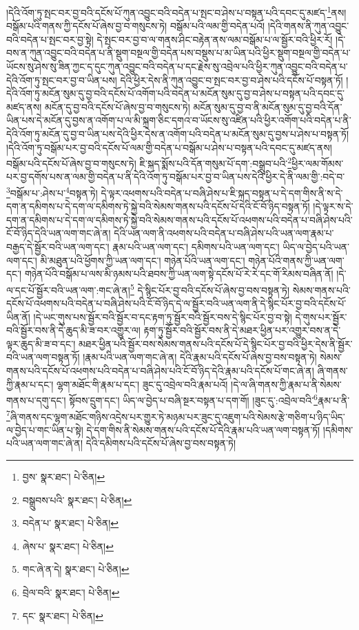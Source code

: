 །དེའི་འོག་ཏུ་སྤང་བར་བྱ་བའི་དངོས་པོ་ཀུན་འབྱུང་བའི་བདེན་པ་སྤང་བ་ཤེས་པ་བསྟན་པའི་དབང་དུ་མཛད་\footnote{བྱས་  སྣར་ཐང་།  པེ་ཅིན། }ནས། བསྒོམ་པའི་གནས་ཀྱི་དངོས་པོ་ཞེས་བྱ་བ་གསུངས་ཏེ། བསྒོམ་པའི་ལམ་གྱི་བདེན་པའོ། །དེའི་གནས་ནི་ཀུན་འབྱུང་བའི་བདེན་པ་སྤང་བར་བྱ་སྟེ། དེ་སྤང་བར་བྱ་བ་ལ་གནས་ཤིང་བརྟེན་ནས་ལམ་བསྒོམ་པ་ལ་སྦྱོར་བའི་ཕྱིར་རོ། །དེ་བས་ན་ཀུན་འབྱུང་བའི་བདེན་པ་ནི་སྡུག་བསྔལ་གྱི་བདེན་པས་བསྡུས་པ་མ་ཡིན་པའི་ཕྱིར་སྡུག་བསྔལ་གྱི་བདེན་པ་ཡོངས་སུ་ཤེས་སུ་ཟིན་ཀྱང་ད་དུང་ཀུན་འབྱུང་བའི་བདེན་པ་དང་རྗེས་སུ་འབྲེལ་པའི་ཕྱིར་ཀུན་འབྱུང་བའི་བདེན་པ་དེའི་འོག་ཏུ་སྤང་བར་བྱ་བ་ཡིན་པས། དེའི་ཕྱིར་དེས་ནི་ཀུན་འབྱུང་བ་སྤང་བར་བྱ་བ་ཤེས་པའི་དངོས་པོ་བསྟན་ཏོ། །དེའི་འོག་ཏུ་མངོན་སུམ་དུ་བྱ་བའི་དངོས་པོ་འགོག་པའི་བདེན་པ་མངོན་སུམ་དུ་བྱ་བ་ཤེས་པ་བསྟན་པའི་དབང་དུ་མཛད་ནས། མངོན་དུ་བྱ་བའི་དངོས་པོ་ཞེས་བྱ་བ་གསུངས་ཏེ། མངོན་སུམ་དུ་བྱ་བ་ནི་མངོན་སུམ་དུ་བྱ་བའི་དོན་ཡིན་པས་དེ་མངོན་དུ་བྱས་ན་འགོག་པ་ལ་མི་སྐྲག་ཅིང་དགའ་བ་ཡོངས་སུ་འཛིན་པའི་ཕྱིར་འགོག་པའི་བདེན་པ་ནི་དེའི་འོག་ཏུ་མངོན་དུ་བྱ་བ་ཡིན་པས་དེའི་ཕྱིར་དེས་ན་འགོག་པའི་བདེན་པ་མངོན་སུམ་དུ་བྱས་པ་ཤེས་པ་བསྟན་ཏོ། །དེའི་འོག་ཏུ་བསྒོམ་པར་བྱ་བའི་དངོས་པོ་ལམ་གྱི་བདེན་པ་བསྒོམ་པ་ཤེས་པ་བསྟན་པའི་དབང་དུ་མཛད་ནས། བསྒོམ་པའི་དངོས་པོ་ཞེས་བྱ་བ་གསུངས་ཏེ། ཇི་སྐད་སྨོས་པའི་དོན་གསུམ་པོ་དག་:བསྒྲུབ་པའི་\footnote{བསྒྲུབས་པའི་  སྣར་ཐང་།  པེ་ཅིན། }ཕྱིར་ལམ་གོམས་པར་བྱ་དགོས་པས་ན་ལམ་གྱི་བདེན་པ་ནི་དེའི་འོག་ཏུ་བསྒོམ་པར་བྱ་བ་ཡིན་པས་དེའི་ཕྱིར་དེ་ནི་ལམ་གྱི་:བདེ་བ་\footnote{བདེན་པ་  སྣར་ཐང་།  པེ་ཅིན། }བསྒོམ་པ་:ཤེས་པ་\footnote{ཞེས་པ་  སྣར་ཐང་།  པེ་ཅིན། }བསྟན་ཏེ། དེ་ལྟར་འཕགས་པའི་བདེན་པ་བཞི་ཤེས་པ་ཇི་སྐད་བསྟན་པ་དེ་དག་གིས་ནི་ས་དེ་དག་ན་དམིགས་པ་དེ་དག་ལ་དམིགས་ཏེ་སྐྱེ་བའི་སེམས་གནས་པའི་དངོས་པོ་དེའི་ངོ་བོ་ཉིད་བསྟན་ཏོ། །དེ་ལྟར་ས་དེ་དག་ན་དམིགས་པ་དེ་དག་ལ་དམིགས་ཏེ་སྐྱེ་བའི་སེམས་གནས་པའི་དངོས་པོ་འཕགས་པའི་བདེན་པ་བཞི་ཤེས་པའི་ངོ་བོ་ཉིད་དེའི་ཡན་ལག་གང་ཞེ་ན། དེའི་ཡན་ལག་ནི་འཕགས་པའི་བདེན་པ་བཞི་ཤེས་པའི་ཡན་ལག་རྣམ་པ་བརྒྱད་དེ་སྦྱོར་བའི་ཡན་ལག་དང་། རྣམ་པའི་ཡན་ལག་དང་། དམིགས་པའི་ཡན་ལག་དང་། ཡིད་ལ་བྱེད་པའི་ཡན་ལག་དང་། མི་མཐུན་པའི་ཕྱོགས་ཀྱི་ཡན་ལག་དང་། གཉེན་པོའི་ཡན་ལག་དང་། གཉེན་པོའི་གནས་ཀྱི་ཡན་ལག་དང་། གཉེན་པོའི་བསྒོམ་པ་ལས་མི་ཉམས་པའི་ཐབས་ཀྱི་ཡན་ལག་སྟེ་དངོས་པོ་རེ་རེ་དང་གོ་རིམས་བཞིན་ནོ། །དེ་ལ་དང་པོ་སྦྱོར་བའི་ཡན་ལག་:གང་ཞེ་ན།\footnote{གང་ཞེ་ན་དེ།  སྣར་ཐང་།  པེ་ཅིན། } དེ་སྙིང་པོར་བྱ་བའི་དངོས་པོ་ཞེས་བྱ་བས་བསྟན་ཏེ། སེམས་གནས་པའི་དངོས་པོ་འཕགས་པའི་བདེན་པ་བཞི་ཤེས་པའི་ངོ་བོ་ཉིད་དེ་ལ་སྦྱོར་བའི་ཡན་ལག་ནི་དེ་སྙིང་པོར་བྱ་བའི་དངོས་པོ་ཡིན་ནོ། །དེ་ཡང་གུས་པས་སྦྱོར་བའི་སྦྱོར་བ་དང་རྟག་ཏུ་སྦྱོར་བའི་སྦྱོར་བས་དེ་སྙིང་པོར་བྱ་བ་སྟེ། དེ་གུས་པར་སྦྱོར་བའི་སྦྱོར་བས་ནི་དེ་ཆུད་མི་ཟ་བར་འགྱུར་ལ། རྟག་ཏུ་སྦྱོར་བའི་སྦྱོར་བས་ནི་དེ་མཐར་ཕྱིན་པར་འགྱུར་བས་ན་དེ་ལྟར་ཆུད་མི་ཟ་བ་དང་། མཐར་ཕྱིན་པའི་སྦྱོར་བས་སེམས་གནས་པའི་དངོས་པོ་དེ་སྙིང་པོར་བྱ་བའི་ཕྱིར་དེས་ནི་སྦྱོར་བའི་ཡན་ལག་བསྟན་ཏོ། །རྣམ་པའི་ཡན་ལག་གང་ཞེ་ན། དེའི་རྣམ་པའི་དངོས་པོ་ཞེས་བྱ་བས་བསྟན་ཏེ། སེམས་གནས་པའི་དངོས་པོ་འཕགས་པའི་བདེན་པ་བཞི་ཤེས་པའི་ངོ་བོ་ཉིད་དེའི་རྣམ་པའི་དངོས་པོ་གང་ཞེ་ན། ཞི་གནས་ཀྱི་རྣམ་པ་དང་། ལྷག་མཐོང་གི་རྣམ་པ་དང་། ཟུང་དུ་འབྲེལ་བའི་རྣམ་པའོ། །དེ་ལ་ཞི་གནས་ཀྱི་རྣམ་པ་ནི་སེམས་གནས་པ་དགུ་དང་། སྟོབས་དྲུག་དང་། ཡིད་ལ་བྱེད་པ་བཞི་སྔར་བསྟན་པ་དག་གོ། །ཟུང་དུ་:འབྲེལ་བའི་\footnote{བྲེལ་བའི་  སྣར་ཐང་།  པེ་ཅིན། }རྣམ་པ་ནི་\footnote{དང་  སྣར་ཐང་།  པེ་ཅིན། }ཞི་གནས་དང་ལྷག་མཐོང་གཉིས་འདྲེས་པར་གྱུར་ཏེ་མཉམ་པར་ཟུང་དུ་འཇུག་པའི་སེམས་རྩེ་གཅིག་པ་ཉིད་ཡིད་ལ་བྱེད་པ་གང་ཡིན་པ་སྟེ། དེ་དག་གིས་ནི་སེམས་གནས་པའི་དངོས་པོ་དེའི་རྣམ་པའི་ཡན་ལག་བསྟན་ཏོ། །དམིགས་པའི་ཡན་ལག་གང་ཞེ་ན། དེའི་དམིགས་པའི་དངོས་པོ་ཞེས་བྱ་བས་བསྟན་ཏེ། 